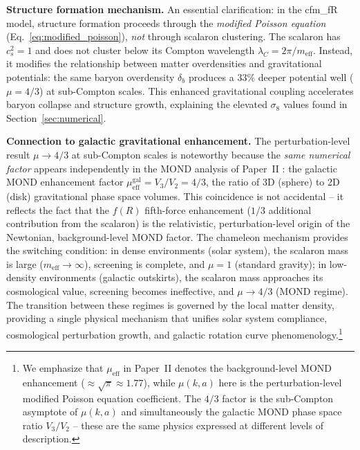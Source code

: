 \documentclass[aps,prd,twocolumn,superscriptaddress,nofootinbib]{revtex4-2}
\begin{document}
\textbf{Structure formation mechanism.} An essential clarification: in the cfm\_fR model, structure formation proceeds through the \textit{modified Poisson equation} (Eq.~\ref{eq:modified_poisson}), \textit{not} through scalaron clustering. The scalaron has $c_s^2 = 1$ and does not cluster below its Compton wavelength $\lambda_C = 2\pi/m_{\mathrm{eff}}$. Instead, it modifies the relationship between matter overdensities and gravitational potentials: the same baryon overdensity $\delta_b$ produces a $33\%$ deeper potential well ($\mu = 4/3$) at sub-Compton scales. This enhanced gravitational coupling accelerates baryon collapse and structure growth, explaining the elevated $\sigma_8$ values found in Section~\ref{sec:numerical}.

\textbf{Connection to galactic gravitational enhancement.} The perturbation-level result $\mu \to 4/3$ at sub-Compton scales is noteworthy because the \textit{same numerical factor} appears independently in the MOND analysis of Paper~II \cite{Geiger2026b}: the galactic MOND enhancement factor $\mu_{\mathrm{eff}}^{\mathrm{gal}} = V_3/V_2 = 4/3$, the ratio of 3D (sphere) to 2D (disk) gravitational phase space volumes. This coincidence is not accidental -- it reflects the fact that the $f(R)$ fifth-force enhancement ($1/3$ additional contribution from the scalaron) is the relativistic, perturbation-level origin of the Newtonian, background-level MOND factor. The chameleon mechanism provides the switching condition: in dense environments (solar system), the scalaron mass is large ($m_{\mathrm{eff}} \to \infty$), screening is complete, and $\mu = 1$ (standard gravity); in low-density environments (galactic outskirts), the scalaron mass approaches its cosmological value, screening becomes ineffective, and $\mu \to 4/3$ (MOND regime). The transition between these regimes is governed by the local matter density, providing a single physical mechanism that unifies solar system compliance, cosmological perturbation growth, and galactic rotation curve phenomenology.\footnote{We emphasize that $\mu_{\mathrm{eff}}$ in Paper~II denotes the background-level MOND enhancement ($\approx \sqrt{\pi} \approx 1.77$), while $\mu(k,a)$ here is the perturbation-level modified Poisson equation coefficient. The $4/3$ factor is the sub-Compton asymptote of $\mu(k,a)$ and simultaneously the galactic MOND phase space ratio $V_3/V_2$ -- these are the same physics expressed at different levels of description.}
\end{document}
